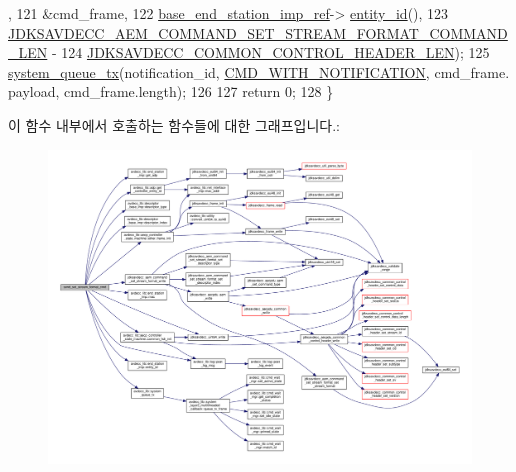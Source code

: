 \begin{DoxyCode}
      ,
121                                                        &cmd\_frame,
122                                                        \hyperlink{classavdecc__lib_1_1descriptor__base__imp_a550c969411f5f3b69f55cc139763d224}{base\_end\_station\_imp\_ref}->
      \hyperlink{classavdecc__lib_1_1end__station__imp_a363b6c9664a0d701def9b17863e20ad3}{entity\_id}(),
123                                                        
      \hyperlink{group__command__set__stream__format_ga54f70043611f17ce7ca3c27c68a02fa6}{JDKSAVDECC\_AEM\_COMMAND\_SET\_STREAM\_FORMAT\_COMMAND\_LEN} -
124                                                            
      \hyperlink{group__jdksavdecc__avtp__common__control__header_gaae84052886fb1bb42f3bc5f85b741dff}{JDKSAVDECC\_COMMON\_CONTROL\_HEADER\_LEN});
125     \hyperlink{namespaceavdecc__lib_a6dd511685627c0865a3442b539a4e8e9}{system\_queue\_tx}(notification\_id, \hyperlink{namespaceavdecc__lib_aabcadff06aa62be0ce47bc0646823604aba48b8a017e06fb240b650cdea965178}{CMD\_WITH\_NOTIFICATION}, cmd\_frame.
      payload, cmd\_frame.length);
126 
127     \textcolor{keywordflow}{return} 0;
128 \}
\end{DoxyCode}


이 함수 내부에서 호출하는 함수들에 대한 그래프입니다.\+:
\nopagebreak
\begin{figure}[H]
\begin{center}
\leavevmode
\includegraphics[width=350pt]{classavdecc__lib_1_1stream__output__descriptor__imp_ad5c08ba242703c9d0f6cab2b08d6aad6_cgraph}
\end{center}
\end{figure}


